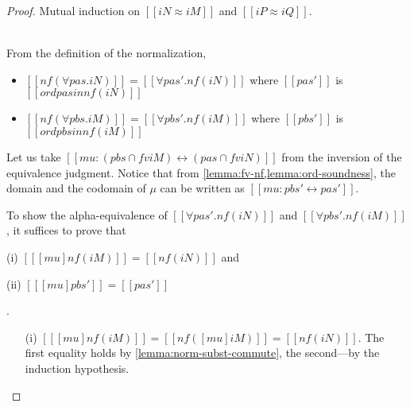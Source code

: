 \lemmaNormalizationCompleteness*
\begin{proof}
  Mutual induction on $[[iN ≈ iM]]$ and $[[iP ≈ iQ]]$.
  \begin{caseof}
  \item {\nameref{\ottdruleEOneForallLabel}} \label{case:ord-completeness:forall} \\

    From the definition of the normalization,
    \begin{itemize}
      \item $[[nf(∀pas.iN)]] = [[∀pas'.nf(iN)]]$ where $[[pas']]$ is $[[ord {pas} in nf(iN)]]$
      \item $[[nf(∀pbs.iM)]] = [[∀pbs'.nf(iM)]]$ where $[[pbs']]$ is $[[ord {pbs} in nf(iM)]]$
    \end{itemize}
    Let us take $[[mu : ({pbs} ∩ fv iM) ↔ ({pas} ∩ fv iN)]]$ from the
    inversion of the equivalence judgment. Notice that from
    \cref{lemma:fv-nf,lemma:ord-soundness}, the domain and the codomain of $\mu$ can be written
    as $[[mu : {pbs'} ↔ {pas'}]]$.
    
    To show the alpha-equivalence of $[[∀pas'.nf(iN)]]$ and $[[∀pbs'.nf(iM)]]$,
    it suffices to prove that
    \begin{enumerate*}
    \item[(i)] $[[ [mu] nf(iM) ]] = [[nf(iN)]]$ and \newline
    \item[(ii)] $[[ [mu]pbs' ]] = [[pas']]$
    \end{enumerate*}.
    
    \begin{enumerate}
    \item[(i)] $[[ [mu] nf(iM) ]] = [[nf([mu]iM)]] = [[nf(iN)]]$.
      The first equality holds by \cref{lemma:norm-subst-commute}, the second---by the induction hypothesis.


\end{enumerate}
\end{caseof}
\end{proof}
